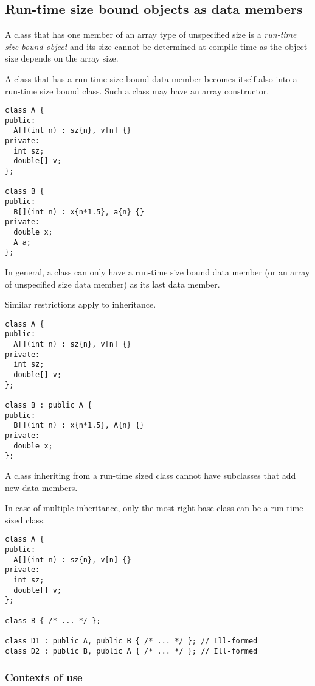 \subsection{Run-time size bound objects as data members}

A class that has one member of an array type of unspecified size is a
\emph{run-time size bound object} and its size cannot be determined at compile
time as the object size depends on the array size.

A class that has a run-time size bound data member becomes itself also into a
run-time size bound class. Such a class may have an array constructor.

\begin{lstlisting}
class A {
public:
  A[](int n) : sz{n}, v[n] {}
private:
  int sz;
  double[] v;
};

class B {
public:
  B[](int n) : x{n*1.5}, a{n} {}
private:
  double x;
  A a;
};
\end{lstlisting}

In general, a class can only have a run-time size bound data member (or 
an array of unspecified size data member) as its last data member. 

Similar restrictions apply to inheritance.

\begin{lstlisting}
class A {
public:
  A[](int n) : sz{n}, v[n] {}
private:
  int sz;
  double[] v;
};

class B : public A {
public:
  B[](int n) : x{n*1.5}, A{n} {}
private:
  double x;
};
\end{lstlisting}

A class inheriting from a run-time sized class cannot have subclasses that add new data members.

In case of multiple inheritance, only the most right base class can be a run-time sized class.

\begin{lstlisting}
class A {
public:
  A[](int n) : sz{n}, v[n] {}
private:
  int sz;
  double[] v;
};

class B { /* ... */ };

class D1 : public A, public B { /* ... */ }; // Ill-formed
class D2 : public B, public A { /* ... */ }; // Ill-formed
\end{lstlisting}

\subsubsection{Contexts of use}

